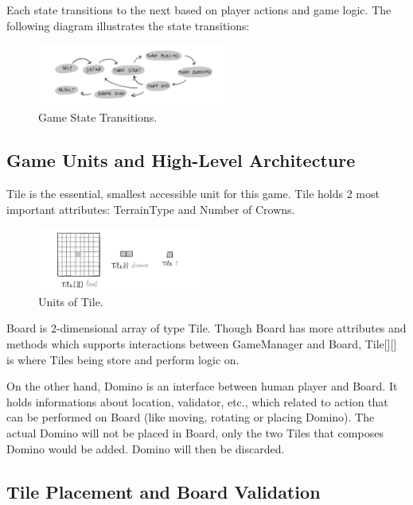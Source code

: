 \documentclass[conference]{IEEEtran}
\begin{document}
Each state transitions to the next based on player actions and game logic. The
following diagram illustrates the state transitions:

\begin{figure}[htbp]
    \centerline{\includegraphics[width=0.55\textwidth]{assets/states.png}}
    \caption{Game State Transitions.}\label{fig:game_states}
\end{figure}

\subsection{Game Units and High-Level Architecture}

Tile is the essential, smallest accessible unit for this game. Tile holds 2
most important attributes: TerrainType and Number of Crowns.

\begin{figure}[htbp]
    \centerline{\includegraphics[width=0.48\textwidth]{assets/unit.png}}
    \caption{Units of Tile.}\label{fig:unit}
\end{figure}

Board is 2-dimensional array of type Tile. Though Board has more attributes and
methods which supports interactions between GameManager and Board, Tile[][] is
where Tiles being store and perform logic on.

On the other hand, Domino is an interface between human player and Board. It
holds informations about location, validator, etc., which related to action
that can be performed on Board (like moving, rotating or placing Domino). The
actual Domino will not be placed in Board, only the two Tiles that composes
Domino would be added. Domino will then be discarded.

\subsection{Tile Placement and Board Validation}
\end{document}
